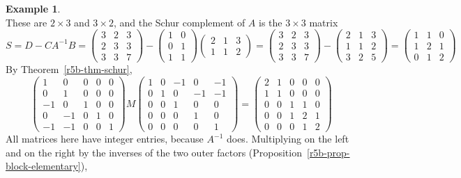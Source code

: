 \documentclass[12pt]{article}
\theoremstyle{definition}
\newtheorem{example}[theorem]{Example}
\begin{document}
\begin{example}
\[\]
These are \(2\times3\) and \(3\times2\), and the Schur complement of \(A\) is the \(3\times3\) matrix
\[
S=D-CA^{-1}B=\begin{pmatrix}3&2&3\\2&3&3\\3&3&7\end{pmatrix}-\begin{pmatrix}1&0\\0&1\\1&1\end{pmatrix}\begin{pmatrix}2&1&3\\1&1&2\end{pmatrix}
=\begin{pmatrix}3&2&3\\2&3&3\\3&3&7\end{pmatrix}-\begin{pmatrix}2&1&3\\1&1&2\\3&2&5\end{pmatrix}
=\begin{pmatrix}1&1&0\\1&2&1\\0&1&2\end{pmatrix}
\]
By Theorem~\ref{r5b-thm-schur},
\[
\left(\begin{array}{cc|ccc}1&0&0&0&0\\0&1&0&0&0\\\hline-1&0&1&0&0\\0&-1&0&1&0\\-1&-1&0&0&1\end{array}\right)M
\left(\begin{array}{cc|ccc}1&0&-1&0&-1\\0&1&0&-1&-1\\\hline0&0&1&0&0\\0&0&0&1&0\\0&0&0&0&1\end{array}\right)
=\left(\begin{array}{cc|ccc}2&1&0&0&0\\1&1&0&0&0\\\hline0&0&1&1&0\\0&0&1&2&1\\0&0&0&1&2\end{array}\right)
\]
All matrices here have integer entries, because \(A^{-1}\) does. Multiplying on the left and on the
right by the inverses of the two outer factors (Proposition~\ref{r5b-prop-block-elementary}),
\[
\]
\end{example}
\end{document}
